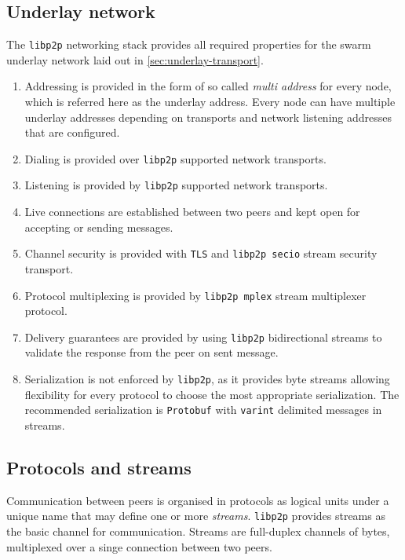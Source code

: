 
\subsection{Underlay network}

The \texttt{libp2p} networking stack provides all required properties for the swarm underlay network laid out in \ref{sec:underlay-transport}.

\begin{enumerate}
\item Addressing is provided in the form of so called \emph{multi address} for every node, which is referred here as the underlay address. Every node can have multiple underlay addresses depending on transports and network listening addresses that are configured.
\item Dialing is provided over \texttt{libp2p} supported network transports.
\item Listening is provided by \texttt{libp2p} supported network transports.
\item Live connections are established between two peers and kept open for accepting or sending messages.
\item Channel security is provided with \texttt{TLS} and \texttt{libp2p secio} stream security transport.
\item Protocol multiplexing is provided by \texttt{libp2p mplex} stream multiplexer protocol.
\item Delivery guarantees are provided by using \texttt{libp2p} bidirectional streams to validate the response from the peer on sent message.
\item Serialization is not enforced by \texttt{libp2p}, as it provides byte streams allowing flexibility for every protocol to choose the most appropriate serialization. The recommended serialization is \texttt{Protobuf} with \texttt{varint} delimited messages in streams.
\end{enumerate}

\subsection{Protocols and streams}

Communication between peers is organised in protocols as logical units under a unique name that may define one or more \emph{streams}. \texttt{libp2p} provides streams as the basic channel for communication. Streams are full-duplex channels of bytes, multiplexed over a singe connection between two peers.

